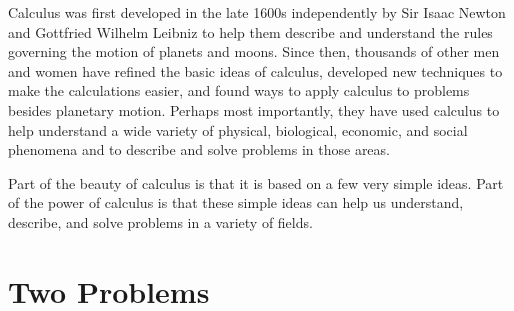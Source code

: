 Calculus was first developed in the late 1600s independently by Sir Isaac Newton and Gottfried Wilhelm Leibniz to help them describe and understand the rules governing the motion of planets and moons. Since then, thousands of other men and women have refined the basic ideas of calculus, developed new techniques to make the calculations easier, and found ways to apply calculus to problems besides planetary motion. Perhaps most importantly, they have used calculus to help understand a wide variety of physical, biological, economic, and social phenomena and to describe and solve problems in those areas.


Part of the beauty of calculus is that it is based on a few very simple ideas. Part of the power of calculus is that these simple ideas can help us understand, describe, and solve problems in a variety of fields.

\section{Two Problems}
\label{sec:twoproblems}

